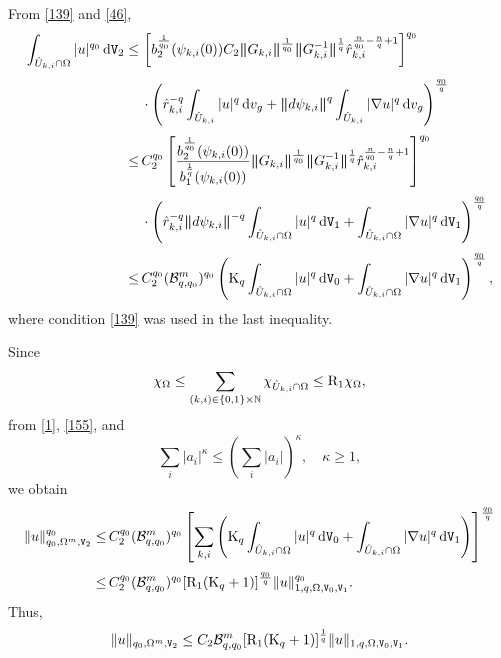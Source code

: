 \documentclass[reqno, 11pt, a4paper]{amsart}
\numberwithin{equation}{section}
\newcommand{\dvg}{\textnormal{d}v_g}
\newcommand{\ck}{\textnormal K}
\newcommand{\wghtv}{\mathtt{V}}
\newcommand{\dwv}{\textnormal{d} \mathtt{V}}
\newcommand{\rd}{\textnormal{R}}
\newcommand{\qxp}{q}
\newcommand{\bnorm}{\boldsymbol{\|}}
\begin{document}
From  \ref{139} and \ref{46},
\begin{equation}\label{155}
\begin{aligned}
\int_{\hat U_{k,i}\cap\Omega}|u|^{\qxp_0}\,\dwv_2 \leq & \, \displaystyle  \left[b_2  ^{\frac{1}{ \qxp _0 }} (\psi _{k,i} (0)) C_2 \bnorm G_{k,i}\bnorm ^{\frac{1}{  \qxp _0 }}  \bnorm G_{k,i} ^{-1}\bnorm ^{\frac{1}{ \qxp}}   \hat r_{k,i}^{\frac{n}{ \qxp _0   }-\frac{n}{\qxp }+1} \right] ^{ \qxp _0 }   \\[3pt]
& \, \displaystyle   \cdot \left(\hat r_{k,i}^{-\qxp  }\int_{\hat U _{k,i}}| u |^{\qxp} \, \dvg + \bnorm d \psi _{k,i}\bnorm ^{\qxp}  \int_{\hat U _{k,i}}|\nabla  u  |^{\qxp}  \, \dvg \right)^{\frac{ \qxp _0 }{ \qxp}  } \\[3pt]
\leq&\,\displaystyle C_2^{\qxp_0}
\left[\frac{b_2^{\frac1{\qxp_0}}(\psi_{k,i}(0))}{b_1^{\frac1\qxp}(\psi_{k,i}(0))}
\bnorm G_{k,i}\bnorm^{\frac1{\qxp_0}}
\bnorm G_{k,i}^{-1}\bnorm^{\frac1\qxp}
\hat r_{k,i}^{\frac n{\qxp_0}-\frac n\qxp+1}\right]^{\qxp_0}\\[3pt]
&\,\displaystyle\cdot\left(\hat r_{k,i}^{-\qxp}\bnorm d\psi_{k,i}\bnorm^{-\qxp}
\int_{\hat U_{k,i}\cap\Omega}|u|^{\qxp}\,\dwv_1
+\int_{\hat U_{k,i}\cap\Omega}|\nabla u|^{\qxp}\,\dwv_1\right)^{\frac{\qxp_0}\qxp}\\[3pt]
\leq&\,\displaystyle C_2^{\qxp_0}(\mathcal B_{\qxp,\qxp_0}^m)^{\qxp_0}
\left(\ck_{\qxp}\int_{\hat U_{k,i}\cap\Omega}|u|^{\qxp}\,\dwv_0
+\int_{\hat U_{k,i}\cap\Omega}|\nabla u|^{\qxp}\,\dwv_1\right)^{\frac{\qxp_0}\qxp},
\end{aligned}
\end{equation}
where condition \ref{139} was used in the last inequality.

Since
$$
\chi_{\Omega}
\leq\sum_{(k,i)\in\{0,1\}\times\mathbb N} \chi_{\hat U_{k,i}\cap \Omega} \leq \rd _1 \chi _{\Omega},
$$
from \ref{1}, \eqref{155}, and
$$
\sum_i|a_i|^\kappa\leq\left(\sum_i|a_i|\right)^\kappa,
\quad \kappa\geq1,
$$
we obtain
\begin{align*}
\|u\|_{\qxp_0,\Omega^{m},\wghtv_2}^{\qxp_0}
\leq&\,\displaystyle C_2 ^{\qxp_0}(\mathcal B_{\qxp,\qxp_0}^m)^{\qxp_0}
\left[\sum_{k,i}\left(\ck_{\qxp}\int_{\hat U_{k,i}\cap\Omega}|u|^{\qxp}\,\dwv_0
+\int_{\hat U_{k,i}\cap\Omega}|\nabla u|^{\qxp}\,\dwv_1\right)\right]^{\frac{\qxp_0}\qxp}\\[3pt]
\leq&\,\displaystyle C_2 ^{\qxp_0}(\mathcal B_{\qxp,\qxp_0}^m)^{\qxp_0}
[\rd_1(\ck_{\qxp}+1)]^{\frac{\qxp_0}\qxp}
\|u\|_{1,\qxp,\Omega,\wghtv_0,\wghtv_1}^{\qxp_0}.
\end{align*}
Thus,
\begin{equation}\label{24}
\|u\|_{\qxp_0,\Omega^{m},\wghtv_2}
\leq C_2 \mathcal B_{\qxp,\qxp_0}^m[\rd_1(\ck_{\qxp}+1)]^{\frac1\qxp}
\|u\|_{1,\qxp,\Omega,\wghtv_0,\wghtv_1}.
\end{equation}
\end{document}
